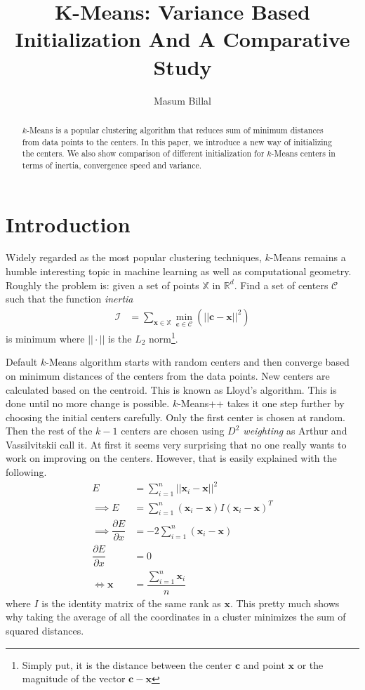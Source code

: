 \documentclass[10pt, leqno]{article}
\author{Masum Billal}
\title{K-Means: Variance Based Initialization And A Comparative Study}
\newcommand{\x}{\mathbf{x}}
\begin{document}
	\maketitle
		\begin{abstract}
			$k$-Means is a popular clustering algorithm that reduces sum of minimum distances from data points to the centers. In this paper, we introduce a new way of initializing the centers. We also show comparison of different initialization for $k$-Means centers in terms of inertia, convergence speed and variance.
		\end{abstract}
	\section{Introduction}
	Widely regarded as the most popular clustering techniques, $k$-Means remains a humble interesting topic in machine learning as well as computational geometry. Roughly the problem is: given a set of points $\mathbb{X}$ in $\mathbb{R}^d$. Find a set of centers $\mathcal{C}$ such that the function \textit{inertia}
		\begin{align*}
			\mathcal{I} & = \sum_{\mathbf{x}\in\mathbb{X}}\min_{\mathbf{c}\in\mathcal{C}}(||\mathbf{c}-\mathbf{x}||^2)
		\end{align*}
	is minimum where $||\cdot||$ is the $L_2$ norm\footnote{Simply put, it is the distance between the center $\mathbf{c}$ and point $\mathbf{x}$ or the magnitude of the vector $\mathbf{c}-\mathbf{x}$}.
	
	Default $k$-Means algorithm starts with random centers and then converge based on minimum distances of the centers from the data points. New centers are calculated based on the centroid. This is known as Lloyd's algorithm\cite{lloyd}. This is done until no more change is possible. $k$-Means++ takes it one step further by choosing the initial centers carefully. Only the first center is chosen at random. Then the rest of the $k-1$ centers are chosen using \textit{$D^2$ weighting} as Arthur and Vassilvitskii\cite{kmeans++} call it. At first it seems very surprising that no one really wants to work on improving on the centers. However, that is easily explained with the following.
		\begin{align*}
			E & = \sum_{i=1}^n||\x_i-\x||^2\\
			\implies E & = \sum_{i=1}^n(\x_i-\x)I(\x_i-\x)^{T}\\
			\implies \dfrac{\partial{E}}{\partial{x}} & = -2\sum_{i=1}^n(\x_i-\x)\\
			\dfrac{\partial{E}}{\partial{x}} & = 0\\
			\iff \x & = \dfrac{\sum_{i=1}^n\x_i}{n}
		\end{align*}
	where $I$ is the identity matrix of the same rank as $\x$. This pretty much shows why taking the average of all the coordinates in a cluster minimizes the sum of squared distances.
	
\end{document}
